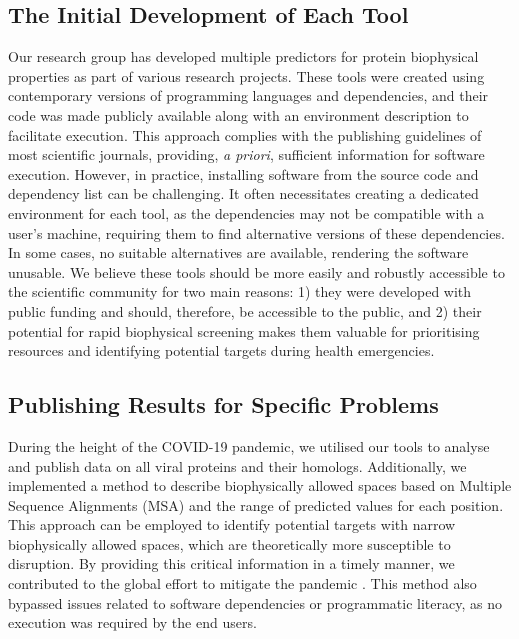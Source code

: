 \subsection{The Initial Development of Each Tool}

Our research group has developed multiple predictors for protein biophysical properties as part of various research projects. These tools were created using contemporary versions of programming languages and dependencies, and their code was made publicly available along with an environment description to facilitate execution. This approach complies with the publishing guidelines of most scientific journals, providing, \textit{a priori}, sufficient information for software execution. However, in practice, installing software from the source code and dependency list can be challenging. It often necessitates creating a dedicated environment for each tool, as the dependencies may not be compatible with a user’s machine, requiring them to find alternative versions of these dependencies. In some cases, no suitable alternatives are available, rendering the software unusable. We believe these tools should be more easily and robustly accessible to the scientific community for two main reasons: 1) they were developed with public funding and should, therefore, be accessible to the public, and 2) their potential for rapid biophysical screening makes them valuable for prioritising resources and identifying potential targets during health emergencies.

\subsection{Publishing Results for Specific Problems}

During the height of the COVID-19 pandemic, we utilised our tools to analyse and publish data on all viral proteins and their homologs. Additionally, we implemented a method to describe biophysically allowed spaces based on Multiple Sequence Alignments (MSA) and the range of predicted values for each position. This approach can be employed to identify potential targets with narrow biophysically allowed spaces, which are theoretically more susceptible to disruption. By providing this critical information in a timely manner, we contributed to the global effort to mitigate the pandemic \cite{kagami_online_2021}. This method also bypassed issues related to software dependencies or programmatic literacy, as no execution was required by the end users.

